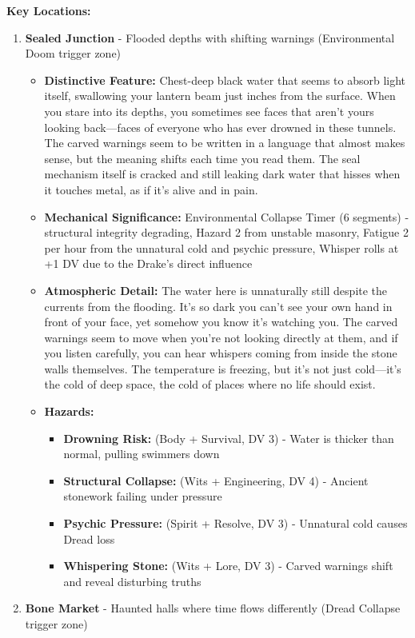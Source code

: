 \documentclass[11pt]{article}
\begin{document}
\textbf{Key Locations:}
\begin{enumerate}
\item \textbf{Sealed Junction} - Flooded depths with shifting warnings (Environmental Doom trigger zone)
  \begin{itemize}
  \item \textbf{Distinctive Feature:} Chest-deep black water that seems to absorb light itself, swallowing your lantern beam just inches from the surface. When you stare into its depths, you sometimes see faces that aren't yours looking back---faces of everyone who has ever drowned in these tunnels. The carved warnings seem to be written in a language that almost makes sense, but the meaning shifts each time you read them. The seal mechanism itself is cracked and still leaking dark water that hisses when it touches metal, as if it's alive and in pain.
  \item \textbf{Mechanical Significance:} Environmental Collapse Timer (6 segments) - structural integrity degrading, Hazard 2 from unstable masonry, Fatigue 2 per hour from the unnatural cold and psychic pressure, Whisper rolls at +1 DV due to the Drake's direct influence
  \item \textbf{Atmospheric Detail:} The water here is unnaturally still despite the currents from the flooding. It's so dark you can't see your own hand in front of your face, yet somehow you know it's watching you. The carved warnings seem to move when you're not looking directly at them, and if you listen carefully, you can hear whispers coming from inside the stone walls themselves. The temperature is freezing, but it's not just cold---it's the cold of deep space, the cold of places where no life should exist.
  \item \textbf{Hazards:}
    \begin{itemize}
    \item \textbf{Drowning Risk:} (Body + Survival, DV 3) - Water is thicker than normal, pulling swimmers down
    \item \textbf{Structural Collapse:} (Wits + Engineering, DV 4) - Ancient stonework failing under pressure
    \item \textbf{Psychic Pressure:} (Spirit + Resolve, DV 3) - Unnatural cold causes Dread loss
    \item \textbf{Whispering Stone:} (Wits + Lore, DV 3) - Carved warnings shift and reveal disturbing truths
    \end{itemize}
  \end{itemize}
\item \textbf{Bone Market} - Haunted halls where time flows differently (Dread Collapse trigger zone)

\end{enumerate}
\end{document}
